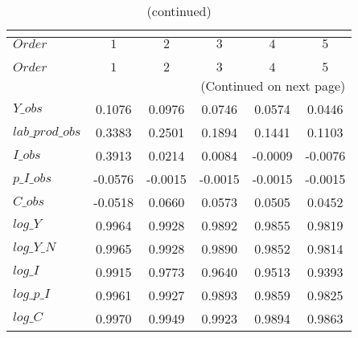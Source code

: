  
\begin{center}
\begin{longtable}{lccccc} 
\caption{COEFFICIENTS OF AUTOCORRELATION}\\
 \label{Table:th_autocorr_matrix}\\
\toprule 
$Order           $	 & 	 $          1$	 & 	 $          2$	 & 	 $          3$	 & 	 $          4$	 & 	 $          5$\\
\midrule \endfirsthead 
\caption{(continued)}\\
 \toprule \\ 
$Order           $	 & 	 $          1$	 & 	 $          2$	 & 	 $          3$	 & 	 $          4$	 & 	 $          5$\\
\midrule \endhead 
\midrule \multicolumn{6}{r}{(Continued on next page)} \\ \bottomrule \endfoot 
\bottomrule \endlastfoot 
$Y\_obs          $	 & 	     0.1076	 & 	     0.0976	 & 	     0.0746	 & 	     0.0574	 & 	     0.0446 \\ 
$lab\_prod\_obs  $	 & 	     0.3383	 & 	     0.2501	 & 	     0.1894	 & 	     0.1441	 & 	     0.1103 \\ 
$I\_obs          $	 & 	     0.3913	 & 	     0.0214	 & 	     0.0084	 & 	    -0.0009	 & 	    -0.0076 \\ 
$p\_I\_obs       $	 & 	    -0.0576	 & 	    -0.0015	 & 	    -0.0015	 & 	    -0.0015	 & 	    -0.0015 \\ 
$C\_obs          $	 & 	    -0.0518	 & 	     0.0660	 & 	     0.0573	 & 	     0.0505	 & 	     0.0452 \\ 
$log\_Y          $	 & 	     0.9964	 & 	     0.9928	 & 	     0.9892	 & 	     0.9855	 & 	     0.9819 \\ 
$log\_Y\_N       $	 & 	     0.9965	 & 	     0.9928	 & 	     0.9890	 & 	     0.9852	 & 	     0.9814 \\ 
$log\_I          $	 & 	     0.9915	 & 	     0.9773	 & 	     0.9640	 & 	     0.9513	 & 	     0.9393 \\ 
$log\_p\_I       $	 & 	     0.9961	 & 	     0.9927	 & 	     0.9893	 & 	     0.9859	 & 	     0.9825 \\ 
$log\_C          $	 & 	     0.9970	 & 	     0.9949	 & 	     0.9923	 & 	     0.9894	 & 	     0.9863 \\ 
\end{longtable}
 \end{center}
